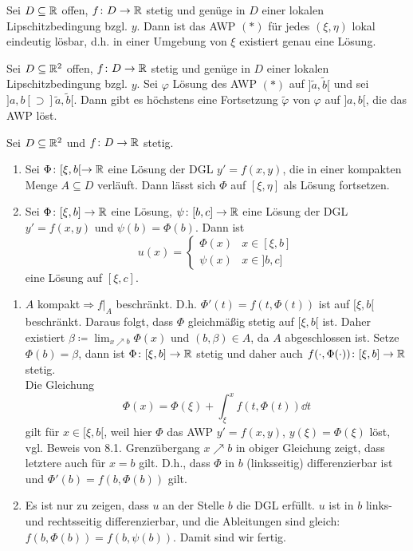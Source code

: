 \begin{satz}
	Sei $ D\subseteq\mathbb{R} $ offen, $ f\colon D\rightarrow\mathbb{R} $ stetig und gen\"uge in $ D $ einer lokalen Lipschitzbedingung bzgl. $ y $. Dann ist das AWP $ (\ast) $ f\"ur jedes $ (\xi,\eta) $ lokal eindeutig l\"osbar, d.h. in einer Umgebung von $ \xi $ existiert genau eine L\"osung.
\end{satz}
\begin{lemma}
	Sei $ D\subseteq\mathbb{R}^2 $ offen, $ f\colon D\rightarrow\mathbb{R} $ stetig und gen\"uge in $ D $ einer lokalen Lipschitzbedingung bzgl. $ y $. Sei $ \varphi $ L\"osung des AWP $ (\ast) $ auf $ ]\tilde a, \tilde b[ $ und sei $ ]a,b[\supset]\tilde a,\tilde b[ $. Dann gibt es h\"ochstens eine Fortsetzung $ \tilde{\varphi} $ von $ \varphi $ auf $ ]a,b[ $, die das AWP l\"ost.
\end{lemma}
\begin{lemma}
	Sei $ D\subseteq\mathbb{R}^2 $ und $ f\colon D\rightarrow\mathbb{R} $ stetig.
	\begin{enumerate}
		\item Sei $ \Phi\colon[\xi,b[\rightarrow\mathbb{R} $ eine L\"osung der DGL $ y'=f(x,y) $, die in einer kompakten Menge $ A\subseteq D $ verl\"auft. Dann l\"asst sich $ \Phi $ auf $ [\xi,\eta] $ als L\"osung fortsetzen.
		\item Sei $ \Phi\colon[\xi,b]\rightarrow\mathbb{R} $ eine L\"osung, $ \psi\colon[b,c]\rightarrow\mathbb{R} $ eine L\"osung der DGL $ y'=f(x,y) $ und $ \psi(b)=\Phi(b) $. Dann ist
		\[ u(x)=\begin{cases}
		\Phi(x)&x\in[\xi,b]\\\psi(x)&x\in]b,c]
		\end{cases} \]
		eine L\"osung auf $ [\xi,c] $.
	\end{enumerate}
\end{lemma}
\begin{beweis}
	\begin{enumerate}
		\item $ A $ kompakt$ \Rightarrow f|_A $ beschr\"ankt. D.h. $ \Phi'(t)=f(t,\Phi(t)) $ ist auf $ [\xi,b[ $ beschr\"ankt. Daraus folgt, dass $ \Phi $ gleichm\"a\ss ig stetig auf $ [\xi,b[ $ ist. Daher existiert $ \beta\coloneqq\lim_{x\nearrow b}\Phi(x) $ und $ (b,\beta)\in A $, da $ A $ abgeschlossen ist. Setze $ \Phi(b)=\beta $, dann ist $ \Phi\colon[\xi,b]\rightarrow\mathbb{R} $ stetig und daher auch $ f(\cdot,\Phi(\cdot))\colon[\xi,b]\rightarrow\mathbb{R} $ stetig.\\
		Die Gleichung
		\[ \Phi(x)=\Phi(\xi)+\int_{\xi}^{x}f(t,\Phi(t))\dd t \]
		gilt f\"ur $ x\in[\xi,b[ $, weil hier $ \Phi $ das AWP $ y'=f(x,y) $, $ y(\xi)=\Phi(\xi) $ l\"ost, vgl. Beweis von 8.1. Grenz\"ubergang $ x\nearrow b $ in obiger Gleichung zeigt, dass letztere auch f\"ur $ x=b $ gilt. D.h., dass $ \Phi $ in $ b $ (linksseitig) differenzierbar ist und $ \Phi'(b)=f(b,\Phi(b)) $ gilt.
		\item Es ist nur zu zeigen, dass $ u $ an der Stelle $ b $ die DGL erf\"ullt. $ u $ ist in $ b $ links- und rechtsseitig differenzierbar, und die Ableitungen sind gleich: $ f(b,\Phi(b))=f(b,\psi(b)) $. Damit sind wir fertig.
	\end{enumerate}
\end{beweis}
